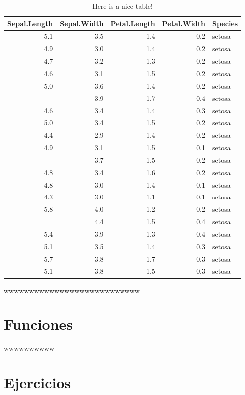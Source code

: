 \documentclass[
  16pt,
]{krantz}
\theoremstyle{definition}
\theoremstyle{definition}
\theoremstyle{definition}
\theoremstyle{definition}
\theoremstyle{remark}
\begin{document}
\begin{table}

\caption{\label{tab:nice-tab}Here is a nice table!}
\centering
\begin{tabular}[t]{rrrrl}
\toprule
Sepal.Length & Sepal.Width & Petal.Length & Petal.Width & Species\\
\midrule
5.1 & 3.5 & 1.4 & 0.2 & setosa\\
4.9 & 3.0 & 1.4 & 0.2 & setosa\\
4.7 & 3.2 & 1.3 & 0.2 & setosa\\
4.6 & 3.1 & 1.5 & 0.2 & setosa\\
5.0 & 3.6 & 1.4 & 0.2 & setosa\\
\addlinespace
5.4 & 3.9 & 1.7 & 0.4 & setosa\\
4.6 & 3.4 & 1.4 & 0.3 & setosa\\
5.0 & 3.4 & 1.5 & 0.2 & setosa\\
4.4 & 2.9 & 1.4 & 0.2 & setosa\\
4.9 & 3.1 & 1.5 & 0.1 & setosa\\
\addlinespace
5.4 & 3.7 & 1.5 & 0.2 & setosa\\
4.8 & 3.4 & 1.6 & 0.2 & setosa\\
4.8 & 3.0 & 1.4 & 0.1 & setosa\\
4.3 & 3.0 & 1.1 & 0.1 & setosa\\
5.8 & 4.0 & 1.2 & 0.2 & setosa\\
\addlinespace
5.7 & 4.4 & 1.5 & 0.4 & setosa\\
5.4 & 3.9 & 1.3 & 0.4 & setosa\\
5.1 & 3.5 & 1.4 & 0.3 & setosa\\
5.7 & 3.8 & 1.7 & 0.3 & setosa\\
5.1 & 3.8 & 1.5 & 0.3 & setosa\\
\bottomrule
\end{tabular}
\end{table}

wwwwwwwwwwwwwwwwwwwwwwwwwww

\hypertarget{funciones}{%
\section{Funciones}\label{funciones}}

wwwwwwwwww \citep{vincze2014college}

\hypertarget{ejercicios}{%
\section{Ejercicios}\label{ejercicios}}
\end{document}
